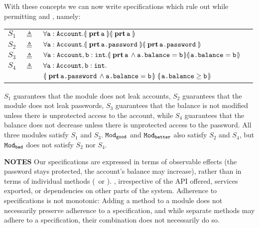 With these concepts we can now write specifications which  rule  out \ModB while permitting \ModA and
\ModC, namely:
\label{s:bankSpecEx}

  
 \begin{tabular}{lcll}
 $S_1$   & $\triangleq$   &  $\forall {{\texttt{a}}:{\texttt{Account}}}.{\llparenthesis}\, {\, \mathbf{prt}\, {\texttt{a}}\, } \,{\rrparenthesis}{\llparenthesis}\, {\, \mathbf{prt}\, {\texttt{a}}\, } \,{\rrparenthesis}$
 \\
 $S_2$   & $\triangleq$   &  $\forall {{\texttt{a}}:{\texttt{Account}}}.{\llparenthesis}\, {\, \mathbf{prt}\, {\texttt{a.password}}\, } \,{\rrparenthesis}{\llparenthesis}\, {\, \mathbf{prt}\, {\texttt{a.password}}\, } \,{\rrparenthesis}$
 \\
 $S_3$ & $\triangleq$   &
 $ \forall {{\texttt{a}}:{\texttt{Account}},{\texttt{b}}:{\texttt{int}}}.{\llparenthesis}\, {\, \mathbf{prt}\, {\texttt{a}}\, } \wedge {\texttt{a.balance}}={\texttt{b}} \,{\rrparenthesis}{\llparenthesis}\,  {\texttt{a.balance}}={\texttt{b}}  \,{\rrparenthesis}$
\\
$S_4$ & $\triangleq$   &
  $\forall {\texttt{a}}:{\texttt{Account}},{\texttt{b}}:{\texttt{int}}.$\\
  &  &  ${\llparenthesis}\, {\, \mathbf{prt}\, {\texttt{a.password}}\, } \wedge {\texttt{a.balance}}={\texttt{b}} \,{\rrparenthesis} 
\  {\llparenthesis}\,  {\texttt{a.balance}}\geq {\texttt{b}}  \,{\rrparenthesis}$
 \end{tabular}




\noindent
 $S_1$ guarantees that the module does not leak accounts, 
 $S_2$ guarantees that the module does not leak passwords,
 $S_3$ guarantees that the balance is not modified unless there is unprotected access to the account, while 
 $S_4$ guarantees that the balance does not decrease unless there is unprotected access to the password.
 All three modules satisfy $S_1$ and $S_3$. ${\texttt{Mod}}_{{\texttt{good}}}$ and ${\texttt{Mod}}_{{\texttt{better}}}$ also satisfy $S_2$ and $S_4$, but ${\texttt{Mod}}_{{\texttt{bad}}}$ does not satisfy $S_2$ nor $S_4$.
 
 
 \noindent
\textbf{NOTES} \notesep  Our specifications are expressed in terms of observable effects (\eg the password stays protected, the account's balance may increase), rather than in terms of individual methods (\eg\,  or ).
, irrespective of the API offered, services  exported, or  dependencies on other parts of the system.
\notesep
{Adherence to   specifications is not monotonic:
Adding a method to a module does not necessarily preserve adherence to
a specification, and while separate methods may adhere to a  specification, their combination does
not necessarily do so. 
}

